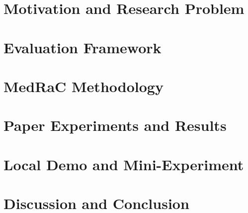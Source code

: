 \documentclass[aspectratio=169]{beamer}
\begin{document}
\section{Motivation and Research Problem}
\showsectionfooterfalse
\begin{frame}
  \titlepage
\end{frame}
\showsectionfootertrue


\section{Evaluation Framework}

\section{MedRaC Methodology}

\section{Paper Experiments and Results}

\section{Local Demo and Mini-Experiment}

\section{Discussion and Conclusion}

\end{document}
